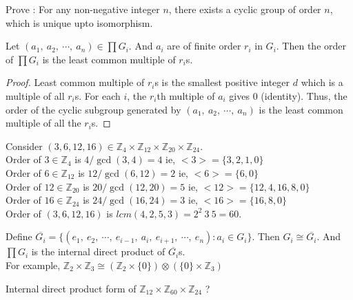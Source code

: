 \begin{question}
	Prove : For any non-negative integer $n$, there exists a cyclic group of order $n$, which is unique upto isomorphism.
\end{question}

\begin{theorem}
	Let $(a_1,\ a_2,\ \cdots,\ a_n) \in \prod G_i$. And $a_i$ are of finite order $r_i$ in $G_i$. Then the order of $\prod G_i$ is the least common multiple of $r_i$s.
\end{theorem}
\begin{proof}
	Least common multiple of $r_i$s is the smallest positive integer $d$ which is a multiple of all $r_i$s.
	For each $i$, the $r_i$th multiple of $a_i$ gives $0$ (identity).
	Thus, the order of the cyclic subgroup generated by $(a_1,\ a_2,\ \cdots,\ a_n)$ is the least common multiple of all the $r_i$s.
\end{proof}
\begin{remark}
	Consider $(3,6,12,16) \in \mathbb{Z}_4 \times \mathbb{Z}_{12} \times \mathbb{Z}_{20} \times \mathbb{Z}_{24}$.\\
	Order of $3 \in \mathbb{Z}_4$ is ${4}/{\gcd(3,4)} = 4$ ie, $<3> = \{ 3,2,1,0 \}$\\
	Order of $6 \in \mathbb{Z}_{12}$ is ${12}/{\gcd(6,12)} = 2$ ie, $<6> = \{ 6,0 \}$\\
	Order of $12 \in \mathbb{Z}_{20}$ is ${20}/{\gcd(12,20)} = 5$ ie, $<12> = \{ 12,4,16,8,0 \}$\\
	Order of $16 \in \mathbb{Z}_{24}$ is ${24}/{\gcd(16,24)} = 3$ ie, $<16> = \{ 16,8,0 \}$\\
	Order of $(3,6,12,16)$ is $lcm(4,2,5,3) = 2^2\ 3\ 5 = 60$.
\end{remark}

\begin{remark}
	Define $\overline{G_i} = \{ (e_1,\ e_2,\ \cdots,\ e_{i-1},\ a_i,\ e_{i+1},\ \cdots,\ e_n) : a_i \in G_i\}$.
	Then $G_i \cong \overline{G_i}$.
	And $\prod G_i$ is the internal direct product of $\overline{G_i}$s.\\

	For example, $\mathbb{Z}_2 \times \mathbb{Z}_3 \cong \left( \mathbb{Z}_2 \times \{ 0 \} \right) \otimes \left( \{ 0 \} \times \mathbb{Z}_3 \right)$
\end{remark}

\begin{question}
	Internal direct product form of $\mathbb{Z}_{12} \times \mathbb{Z}_{60} \times \mathbb{Z}_{24}$ ?
\end{question}
\pagebreak

